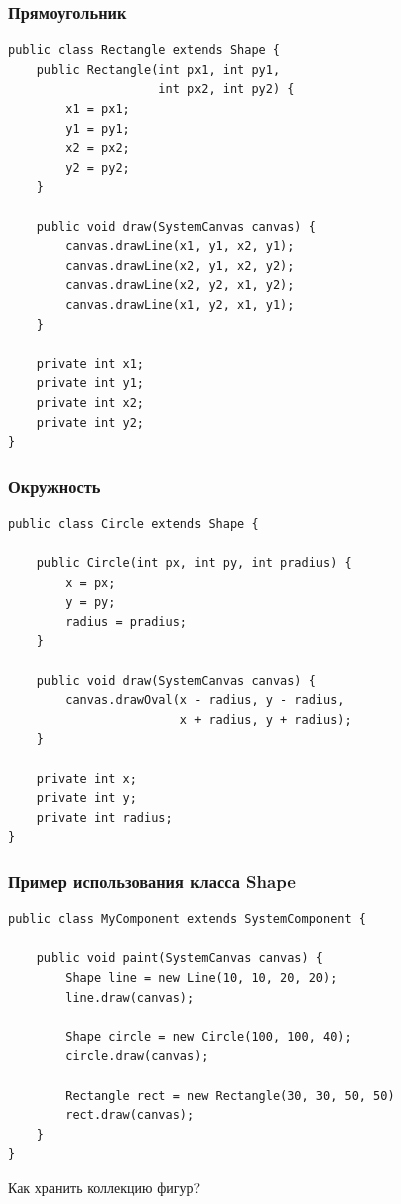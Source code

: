 \documentclass[handout]{beamer}
\begin{document}
\begin{frame}[fragile]
\frametitle{Прямоугольник}
\begin{lstlisting}
public class Rectangle extends Shape {
    public Rectangle(int px1, int py1,
                     int px2, int py2) {
        x1 = px1;
        y1 = py1;
        x2 = px2;
        y2 = py2;
    }

    public void draw(SystemCanvas canvas) {
        canvas.drawLine(x1, y1, x2, y1);
        canvas.drawLine(x2, y1, x2, y2);
        canvas.drawLine(x2, y2, x1, y2);
        canvas.drawLine(x1, y2, x1, y1);
    }

    private int x1;
    private int y1;
    private int x2;
    private int y2;
}
\end{lstlisting}
\end{frame}


\begin{frame}[fragile]
\frametitle{Окружность}
\begin{lstlisting}
public class Circle extends Shape {

    public Circle(int px, int py, int pradius) {
        x = px;
        y = py;
        radius = pradius;
    }

    public void draw(SystemCanvas canvas) {
        canvas.drawOval(x - radius, y - radius,
                        x + radius, y + radius);
    }

    private int x;
    private int y;
    private int radius;
}
\end{lstlisting}
\end{frame}


\begin{frame}[fragile]
\frametitle{Пример использования класса Shape}
\begin{lstlisting}
public class MyComponent extends SystemComponent {

    public void paint(SystemCanvas canvas) {
        Shape line = new Line(10, 10, 20, 20);
        line.draw(canvas);

        Shape circle = new Circle(100, 100, 40);
        circle.draw(canvas);

        Rectangle rect = new Rectangle(30, 30, 50, 50)
        rect.draw(canvas);
    }
}
\end{lstlisting}
\end{frame}


\begin{frame}[fragile]
\begin{center}
\huge Как хранить коллекцию фигур?
\end{center}
\end{frame}
\end{document}
